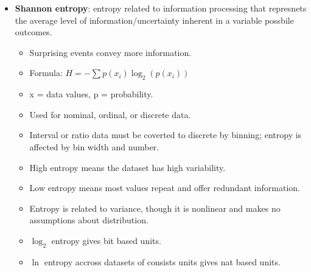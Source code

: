 \documentclass[12pt,a4paper]{article}
\begin{document}
\begin{itemize}
    \item \textbf{Shannon entropy}: entropy related to information processing that represnets the average level of information/uncertainty inherent in a variable possbile outcomes.
        \begin{itemize}
            \item Surprising events convey more information.
            \item Formula: {\color{o-Sun}\(H = -\sum p(x_i)\log_2(p(x_i))\)}
            \item x = data values, p = probability.
            \item Used for nominal, ordinal, or discrete data.
            \item Interval or ratio data must be coverted to discrete by binning; entropy is affected by bin width and number.
            \item {\color{pos}High entropy} means the dataset has {\color{pos}high variability}.
            \item {\color{neg}Low entropy} means most values repeat and offer {\color{neg}redundant} information.
            \item Entropy is related to variance, though it is 
            {\color{o-Sun}nonlinear} and makes {\color{o-Sun}no assumptions} about distribution.
            \item \(\log_2\) entropy gives {\color{o-Sun}bit} based units.
            \item \(\ln\) entropy accross datasets of consists units gives {\color{o-Sun}nat} based units.
        \end{itemize}
\end{itemize}


\end{document}
